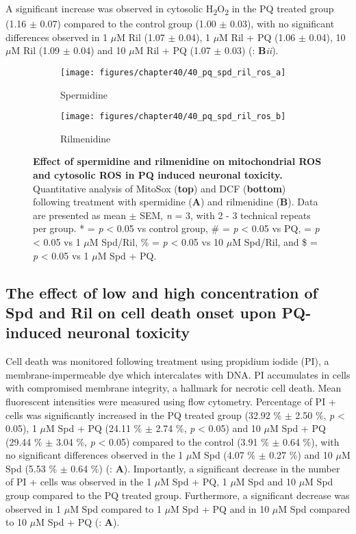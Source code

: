 A significant increase was observed in cytosolic H\textsubscript{2}O\textsubscript{2} in the PQ treated group (1.16 $\pm$ 0.07) compared to the control group (1.00 $\pm$ 0.03), with no significant differences observed in 1 $\mu$M Ril (1.07 $\pm$ 0.04), 1 $\mu$M Ril + PQ (1.06 $\pm$ 0.04), 10 $\mu$M Ril (1.09 $\pm$ 0.04) and 10 $\mu$M Ril + PQ (1.07 $\pm$ 0.03) (: \textbf{B}\textit{ii}).


\begin{figure}[!htbp]
  \center
  \begin{subfigure}[b]{0.495\linewidth}
    \texttt{[image: figures/chapter40/40\_pq\_spd\_ril\_ros\_a]}
    \caption{Spermidine}
  \end{subfigure}
  \begin{subfigure}[b]{0.495\linewidth}
    \texttt{[image: figures/chapter40/40\_pq\_spd\_ril\_ros\_b]}
    \caption{Rilmenidine}
  \end{subfigure}
  \caption[Effect of spermidine and rilmenidine on mitochondrial ROS and cytosolic ROS in PQ induced neuronal toxicity]{\textbf{Effect of spermidine and rilmenidine on mitochondrial ROS and cytosolic ROS in PQ induced neuronal toxicity.} Quantitative analysis of MitoSox (\textbf{top}) and DCF (\textbf{bottom}) following treatment with spermidine (\textbf{A}) and rilmenidine (\textbf{B}). Data are presented as mean $\pm$ SEM, \textit{n} = 3, with 2 - 3 technical repeats per group. * = \textit{p} < 0.05 vs control group, \# = \textit{p} < 0.05 vs PQ, \@ = \textit{p} < 0.05 vs 1 $\mu$M Spd/Ril, \% = \textit{p} < 0.05 vs 10 $\mu$M Spd/Ril, and \$ = \textit{p} < 0.05 vs 1 $\mu$M Spd + PQ.}
  \label{fig:40_pq_spd_ril_ros_a}
\end{figure} 

\subsection{The effect of low and high concentration of Spd and Ril on cell death onset upon PQ-induced neuronal toxicity} 
Cell death was monitored following treatment using propidium iodide (PI), a membrane-impermeable dye which intercalates with DNA. PI accumulates in cells with compromised membrane integrity, a hallmark for necrotic cell death. Mean fluorescent intensities were measured using flow cytometry. Percentage of PI + cells was significantly increased in the PQ treated group (32.92 \% $\pm$ 2.50 \%, \textit{p} < 0.05), 1 $\mu$M Spd + PQ (24.11 \% $\pm$ 2.74 \%, \textit{p} < 0.05) and 10 $\mu$M Spd + PQ (29.44 \% $\pm$ 3.04 \%, \textit{p} < 0.05) compared to the control (3.91 \% $\pm$ 0.64 \%), with no significant differences observed in the 1 $\mu$M Spd (4.07 \% $\pm$ 0.27 \%) and 10 $\mu$M Spd (5.53 \% $\pm$ 0.64 \%) (: \textbf{A}). Importantly, a significant decrease in the number of PI + cells was observed in the 1 $\mu$M Spd + PQ, 1 $\mu$M Spd and 10 $\mu$M Spd group compared to the PQ treated group. Furthermore, a significant decrease was observed in 1 $\mu$M Spd compared to 1 $\mu$M Spd + PQ and in 10 $\mu$M Spd compared to 10 $\mu$M Spd + PQ (: \textbf{A}).

